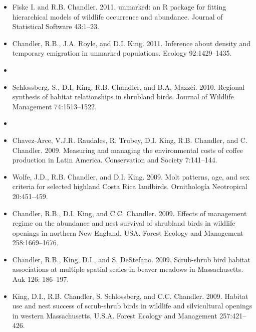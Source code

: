 \begin{itemize}
\item Fiske I. and R.B. Chandler. 2011. unmarked: an R package
  for fitting hierarchical models of wildlife occurrence and
  abundance. Journal of Statistical Software 43:1--23.

\item Chandler, R.B., J.A. Royle, and D.I. King. 2011. Inference
  about density and temporary emigration in unmarked
  populations. Ecology 92:1429--1435.


\item[] { \\}

\item Schlossberg, S., D.I. King, R.B. Chandler, and
  B.A. Mazzei. 2010. Regional synthesis of habitat relationships in
  shrubland birds. Journal of Wildlife Management 74:1513--1522.

\item[] { \\}

\item Chavez-Arce, V.J.R. Raudales, R. Trubey, D.I. King,
  R.B. Chandler, and C. Chandler. 2009. Measuring and managing the
  environmental costs of coffee production in Latin
  America. Conservation and Society 7:141--144.

\item Wolfe, J.D., R.B. Chandler, and D.I. King. 2009. Molt
  patterns, age, and sex criteria for selected highland Costa Rica
  landbirds. Ornitholog\'{i}a Neotropical 20:451--459.

\item Chandler, R.B., D.I. King, and C.C. Chandler. 2009. Effects
  of management regime on the abundance and nest survival of shrubland
  birds in wildlife openings in northern New England, USA. Forest
  Ecology and Management 258:1669--1676.

\item Chandler, R.B., King, D.I., and
  S. DeStefano. 2009. Scrub-shrub bird habitat associations at
  multiple spatial scales in beaver meadows in Massachusetts. Auk 126:
  186--197.

\item King, D.I., R.B. Chandler, S. Schlossberg, and
  C.C. Chandler. 2009. Habitat use and nest success of scrub-shrub
  birds in wildlife and silvicultural openings in western
  Massachusetts, U.S.A. Forest Ecology and Management 257:421--426.


\end{itemize}
